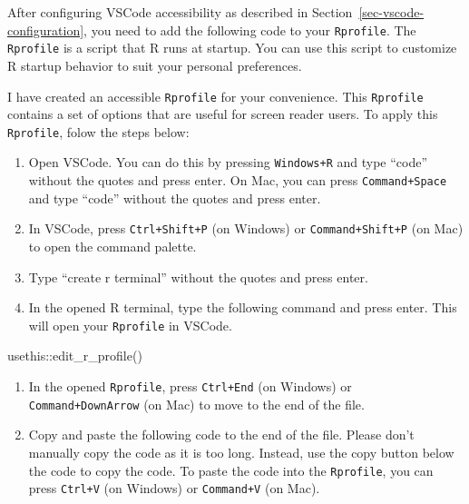 \documentclass[
  letterpaper,
  DIV=11,
  numbers=noendperiod]{scrartcl}
\newenvironment{Shaded}{\begin{snugshade}}{\end{snugshade}}
\newcommand{\FunctionTok}[1]{\textcolor[rgb]{0.28,0.35,0.67}{#1}}
\newcommand{\NormalTok}[1]{\textcolor[rgb]{0.00,0.23,0.31}{#1}}
\newcommand{\SpecialCharTok}[1]{\textcolor[rgb]{0.37,0.37,0.37}{#1}}
\begin{document}
After configuring VSCode accessibility as described in
Section~\ref{sec-vscode-configuration}, you need to add the following
code to your \texttt{Rprofile}. The \texttt{Rprofile} is a script that R
runs at startup. You can use this script to customize R startup behavior
to suit your personal preferences.

I have created an accessible \texttt{Rprofile} for your convenience.
This \texttt{Rprofile} contains a set of options that are useful for
screen reader users. To apply this \texttt{Rprofile}, folow the steps
below:

\begin{enumerate}
\def\labelenumi{\arabic{enumi}.}
\item
  Open VSCode. You can do this by pressing \texttt{Windows+R} and type
  ``code'' without the quotes and press enter. On Mac, you can press
  \texttt{Command+Space} and type ``code'' without the quotes and press
  enter.
\item
  In VSCode, press \texttt{Ctrl+Shift+P} (on Windows) or
  \texttt{Command+Shift+P} (on Mac) to open the command palette.
\item
  Type ``create r terminal'' without the quotes and press enter.
\item
  In the opened R terminal, type the following command and press enter.
  This will open your \texttt{Rprofile} in VSCode.
\end{enumerate}

\begin{Shaded}
\begin{Highlighting}[]
\NormalTok{usethis}\SpecialCharTok{::}\FunctionTok{edit\_r\_profile}\NormalTok{()}
\end{Highlighting}
\end{Shaded}

\begin{enumerate}
\def\labelenumi{\arabic{enumi}.}
\setcounter{enumi}{4}
\item
  In the opened \texttt{Rprofile}, press \texttt{Ctrl+End} (on Windows)
  or \texttt{Command+DownArrow} (on Mac) to move to the end of the file.
\item
  Copy and paste the following code to the end of the file. Please don't
  manually copy the code as it is too long. Instead, use the copy button
  below the code to copy the code. To paste the code into the
  \texttt{Rprofile}, you can press \texttt{Ctrl+V} (on Windows) or
  \texttt{Command+V} (on Mac).
\end{enumerate}
\end{document}
